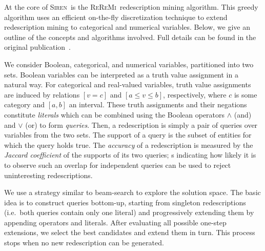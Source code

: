 \documentclass{llncs}
\newcommand{\Siren}{\textsc{Siren}}
\newcommand{\ReReMi}{\textsc{ReReMi}}
\begin{document}
At the core of \Siren\ is the \ReReMi\ redescription mining
algorithm. This greedy algorithm uses an efficient on-the-fly
discretization technique to extend redescription mining to categorical
and numerical variables.  Below, we give an outline of the concepts and
algorithms involved. Full details can be found
in the original publication~\cite{galbrun11black}.

We consider Boolean, categorical, and numerical variables, partitioned
into two sets. Boolean variables can be interpreted as a truth value
assignment in a natural way.  For categorical and real-valued
variables, truth value assignments are induced by relations $[v=c]$
and $[a \leq v \leq b]$, respectively, where $c$ is some category and
$[a, b]$ an interval.  These truth assignments and their negations
constitute \emph{literals} which can be combined using the Boolean
operators $\land$ (and) and $\lor$ (or) to form \emph{queries}.  Then,
a redescription is simply a pair of queries over variables from the
two sets.  The support of a query is the subset of entities for which
the query holds true.  The \emph{accuracy} of a redescription is
measured by the \emph{Jaccard coefficient} of the supports of its two
queries; \pValue{}s indicating how likely it is to observe such an
overlap for independent queries can be used to reject uninteresting
redescriptions.

We use a strategy similar to beam-search to explore the
solution space.  The basic idea is to construct queries bottom-up,
starting from singleton redescriptions (i.e.\ both queries contain
only one literal) and progressively extending them by appending
operators and literals. %
After evaluating all
possible one-step extensions, we select the best candidates and extend
them in turn. This process stops when no new redescription can
be generated.
\end{document}
